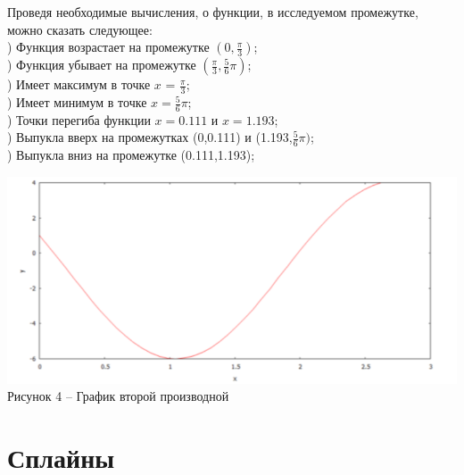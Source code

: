 \documentclass[russian, utf8, nocolumnxxxi, nocolumnxxxii, 14pt]{eskdtext}
\begin{document}
\newpage
\indent Проведя необходимые вычисления, о функции, в исследуемом промежутке, можно сказать следующее:\\
) Функция возрастает на промежутке $(0,\frac{\pi}{3})$;\\
) Функция убывает на промежутке $(\frac{\pi}{3},\frac{5}{6}\pi)$;\\
) Имеет максимум в точке $x$ = $\frac{\pi}{3}$;\\
) Имеет минимум в точке $x = \frac{5}{6}\pi$;\\
) Точки перегиба функции $x = 0.111$ и $x = 1.193$;\\
) Выпукла вверх на промежутках (0,0.111) и (1.193,$\frac{5}{6}\pi)$;\\
) Выпукла вниз на промежутке (0.111,1.193);\\
\begin{center}
\includegraphics[scale=0.8]{JPG/vier.png}\\
Рисунок 4 -- График второй производной\\
\end{center}
\newpage
\section{Сплайны}\\
\end{document}
